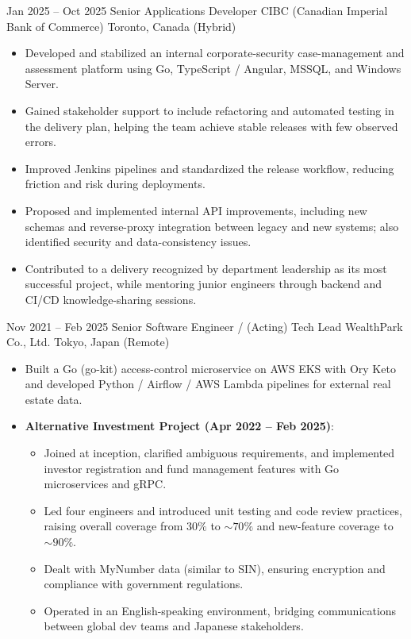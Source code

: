 \documentclass[11pt,letterpaper]{moderncv}
\begin{document}
\cventry
    {Jan 2025 -- Oct 2025}
    {Senior Applications Developer}
    {CIBC (Canadian Imperial Bank of Commerce)}
    {Toronto, Canada (Hybrid)}
    {}
    {
      \begin{itemize}
        \item Developed and stabilized an internal corporate-security case-management and assessment platform using Go, TypeScript / Angular, MSSQL, and Windows Server.
        \item Gained stakeholder support to include refactoring and automated testing in the delivery plan, helping the team achieve stable releases with few observed errors.
        \item Improved Jenkins pipelines and standardized the release workflow, reducing friction and risk during deployments.
        \item Proposed and implemented internal API improvements, including new schemas and reverse-proxy integration between legacy and new systems; also identified security and data-consistency issues.
        \item Contributed to a delivery recognized by department leadership as its most successful project, while mentoring junior engineers through backend and CI/CD knowledge-sharing sessions.
      \end{itemize}
    }

\cventry
    {Nov 2021 -- Feb 2025}
    {Senior Software Engineer / (Acting) Tech Lead}
    {WealthPark Co., Ltd.}
    {Tokyo, Japan (Remote)}
    {}
    {
      \begin{itemize}
        \item Built a Go (go-kit) access-control microservice on AWS EKS with Ory Keto and developed Python / Airflow / AWS Lambda pipelines for external real estate data.
        \item \textbf{Alternative Investment Project (Apr 2022 -- Feb 2025)}:
        \begin{itemize}
          \item Joined at inception, clarified ambiguous requirements, and implemented investor registration and fund management features with Go microservices and gRPC.
          \item Led four engineers and introduced unit testing and code review practices, raising overall coverage from $30\%$ to $\sim70\%$ and new-feature coverage to $\sim90\%$.
          \item Dealt with MyNumber data (similar to SIN), ensuring encryption and compliance with government regulations.
          \item Operated in an English-speaking environment, bridging communications between global dev teams and Japanese stakeholders.
        \end{itemize}
      \end{itemize}
    }
\end{document}

